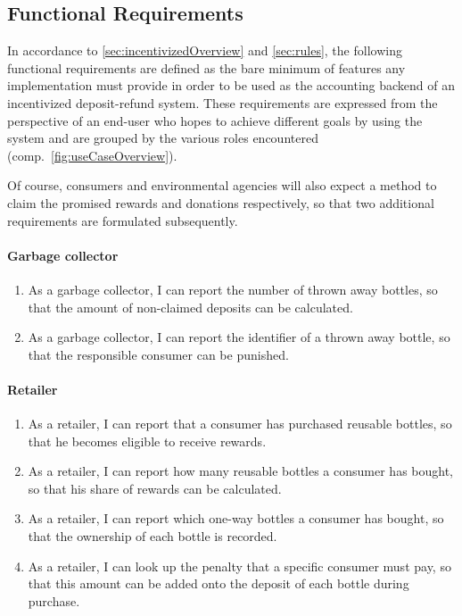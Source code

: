 \def\twodigits#1{%
  \ifnum#1<10 0\fi
  \number#1}


\subsection{Functional Requirements}
In accordance to \ref{sec:incentivizedOverview} and \ref{sec:rules}, the following functional requirements are defined as the bare minimum of features any implementation must provide in order to be used as the accounting backend of an incentivized deposit-refund system. These requirements are expressed from the perspective of an end-user who hopes to achieve different goals by using the system and are grouped by the various roles encountered (comp.~\autoref{fig:useCaseOverview}).

Of course, consumers and environmental agencies will also expect a method to claim the promised rewards and donations respectively, so that two additional requirements are formulated subsequently.

\paragraph{Garbage collector}
\begin{enumerate}[label={\textbf{FR-\protect\twodigits{\theenumi}}},leftmargin=*]
	\item As a garbage collector, I can report the number of thrown away bottles, so that the amount of non-claimed deposits can be calculated. \label{itm:reportNumber}
	\item As a garbage collector, I can report the identifier of a thrown away bottle, so that the responsible consumer can be punished. \label{itm:reportIdentifier}
\end{enumerate}

\paragraph{Retailer}
\begin{enumerate}[resume, label={\textbf{FR-\protect\twodigits{\theenumi}}},leftmargin=*]
	\item As a retailer, I can report that a consumer has purchased reusable bottles, so that he becomes eligible to receive rewards.
	\item As a retailer, I can report how many reusable bottles a consumer has bought, so that his share of rewards can be calculated. \label{itm:reportReusables}
	\item As a retailer, I can report which one-way bottles a consumer has bought, so that the ownership of each bottle is recorded. \label{itm:reportOneWays}
	\item As a retailer, I can look up the penalty that a specific consumer must pay, so that this amount can be added onto the deposit of each bottle during purchase. \label{itm:lookUpPenalty}
\end{enumerate}

